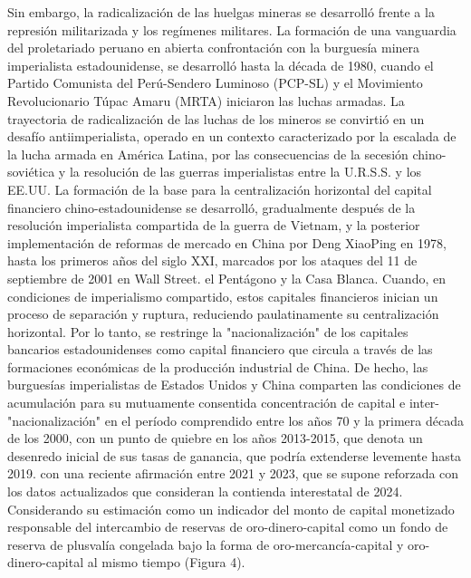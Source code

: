 \documentclass[]{interact}
\theoremstyle{plain}%
\theoremstyle{definition}
\theoremstyle{remark}
\begin{document}
Sin embargo, la radicalización de las huelgas mineras se desarrolló frente a la represión militarizada y los regímenes militares. La formación de una vanguardia del proletariado peruano en abierta confrontación con la burguesía minera imperialista estadounidense, se desarrolló hasta la década de 1980, cuando el Partido Comunista del Perú-Sendero Luminoso (PCP-SL) y el Movimiento Revolucionario Túpac Amaru (MRTA) iniciaron las luchas armadas. La trayectoria de radicalización de las luchas de los mineros se convirtió en un desafío antiimperialista, operado en un contexto caracterizado por la escalada de la lucha armada en América Latina, por las consecuencias de la secesión chino-soviética y la resolución de las guerras imperialistas entre la U.R.S.S. y los EE.UU. La formación de la base para la centralización horizontal del capital financiero chino-estadounidense se desarrolló, gradualmente después de la resolución imperialista compartida de la guerra de Vietnam, y la posterior implementación de reformas de mercado en China por Deng XiaoPing en 1978, hasta los primeros años del siglo XXI, marcados por los ataques del 11 de septiembre de 2001 en Wall Street. el Pentágono y la Casa Blanca. Cuando, en condiciones de imperialismo compartido, estos capitales financieros inician un proceso de separación y ruptura, reduciendo paulatinamente su centralización horizontal. Por lo tanto, se restringe la "nacionalización" de los capitales bancarios estadounidenses como capital financiero que circula a través de las formaciones económicas de la producción industrial de China. De hecho, las burguesías imperialistas de Estados Unidos y China comparten las condiciones de acumulación para su mutuamente consentida concentración de capital e inter-"nacionalización" en el período comprendido entre los años 70 y la primera década de los 2000, con un punto de quiebre en los años 2013-2015, que denota un desenredo inicial de sus tasas de ganancia, que podría extenderse levemente hasta 2019. con una reciente afirmación entre 2021 y 2023, que se supone reforzada con los datos actualizados que consideran la contienda interestatal de 2024. Considerando su estimación como un indicador del monto de capital monetizado responsable del intercambio de reservas de oro-dinero-capital como un fondo de reserva de plusvalía congelada bajo la forma de oro-mercancía-capital y oro-dinero-capital al mismo tiempo (Figura 4). 
\end{document}
